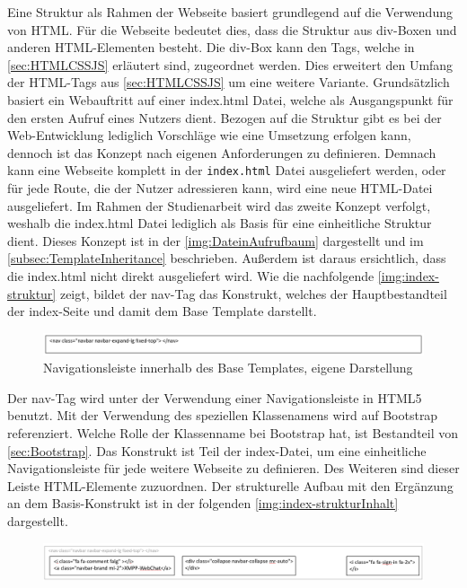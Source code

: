 \documentclass[a4paper,titlepage,halfparskip,12pt]{scrreprt}
\begin{document}
\begin{onehalfspacing}
Eine Struktur als Rahmen der Webseite basiert grundlegend auf die Verwendung von \ac{HTML}. Für die Webseite bedeutet dies, dass die Struktur aus div-Boxen und anderen \ac{HTML}-Elementen besteht. Die div-Box kann den Tags, welche in \autoref{sec:HTMLCSSJS} erläutert sind, zugeordnet werden. Dies erweitert den Umfang der \ac{HTML}-Tags aus \autoref{sec:HTMLCSSJS} um eine weitere Variante. Grundsätzlich basiert ein Webauftritt auf einer index.html Datei, welche als Ausgangspunkt für den ersten Aufruf eines Nutzers dient. Bezogen auf die Struktur gibt es bei der Web-Entwicklung lediglich Vorschläge wie eine Umsetzung erfolgen kann, dennoch ist das Konzept nach eigenen Anforderungen zu definieren. Demnach kann eine Webseite komplett in der \texttt{index.html} Datei ausgeliefert werden, oder für jede Route, die der Nutzer adressieren kann, wird eine neue \ac{HTML}-Datei ausgeliefert. Im Rahmen der Studienarbeit wird das zweite Konzept verfolgt, weshalb die index.html Datei lediglich als Basis für eine einheitliche Struktur dient. Dieses Konzept ist in der \autoref{img:DateinAufrufbaum} dargestellt und im \autoref{subsec:TemplateInheritance} beschrieben. Außerdem ist daraus ersichtlich, dass die index.html nicht direkt ausgeliefert wird. Wie die nachfolgende \autoref{img:index-struktur} zeigt, bildet der nav-Tag das Konstrukt, welches der Hauptbestandteil der index-Seite und damit dem Base Template darstellt.
\begin{figure}[h]
	\centering
	\includegraphics[width=\linewidth]{images/indexbody}
	\caption{Navigationsleiste innerhalb des Base Templates, eigene Darstellung}
	\label{img:index-struktur}
\end{figure}
Der nav-Tag wird unter der Verwendung einer Navigationsleiste in HTML5 benutzt. Mit der Verwendung des speziellen Klassenamens wird auf Bootstrap referenziert. Welche Rolle der Klassenname bei Bootstrap hat, ist Bestandteil von \autoref{sec:Bootstrap}. Das Konstrukt ist Teil der index-Datei, um eine einheitliche Navigationsleiste für jede weitere Webseite zu definieren. Des Weiteren sind dieser Leiste HTML-Elemente zuzuordnen. Der strukturelle Aufbau mit den Ergänzung an dem Basis-Konstrukt ist in der folgenden \autoref{img:index-strukturInhalt} dargestellt.
\begin{figure}[h]
	\centering
	\includegraphics[width=\linewidth]{images/indexbodyInhalt}

\end{figure}
\end{onehalfspacing}
\end{document}
